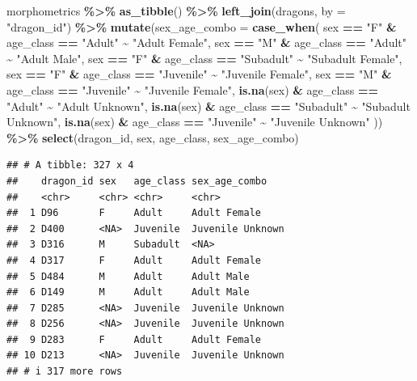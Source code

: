 \documentclass[
]{book}
\newenvironment{Shaded}{\begin{snugshade}}{\end{snugshade}}
\newcommand{\AttributeTok}[1]{\textcolor[rgb]{0.13,0.29,0.53}{#1}}
\newcommand{\FunctionTok}[1]{\textcolor[rgb]{0.13,0.29,0.53}{\textbf{#1}}}
\newcommand{\NormalTok}[1]{#1}
\newcommand{\SpecialCharTok}[1]{\textcolor[rgb]{0.81,0.36,0.00}{\textbf{#1}}}
\newcommand{\StringTok}[1]{\textcolor[rgb]{0.31,0.60,0.02}{#1}}
\begin{document}
\begin{Shaded}
\begin{Highlighting}[]
\NormalTok{morphometrics }\SpecialCharTok{\%\textgreater{}\%} 
  \FunctionTok{as\_tibble}\NormalTok{() }\SpecialCharTok{\%\textgreater{}\%} 
  \FunctionTok{left\_join}\NormalTok{(dragons, }\AttributeTok{by =} \StringTok{"dragon\_id"}\NormalTok{) }\SpecialCharTok{\%\textgreater{}\%} 
  \FunctionTok{mutate}\NormalTok{(}\AttributeTok{sex\_age\_combo =} \FunctionTok{case\_when}\NormalTok{(}
\NormalTok{    sex }\SpecialCharTok{==} \StringTok{"F"} \SpecialCharTok{\&}\NormalTok{ age\_class }\SpecialCharTok{==} \StringTok{"Adult"} \SpecialCharTok{\textasciitilde{}} \StringTok{"Adult Female"}\NormalTok{,}
\NormalTok{    sex }\SpecialCharTok{==} \StringTok{"M"} \SpecialCharTok{\&}\NormalTok{ age\_class }\SpecialCharTok{==} \StringTok{"Adult"} \SpecialCharTok{\textasciitilde{}} \StringTok{"Adult Male"}\NormalTok{,}
\NormalTok{    sex }\SpecialCharTok{==} \StringTok{"F"} \SpecialCharTok{\&}\NormalTok{ age\_class }\SpecialCharTok{==} \StringTok{"Subadult"} \SpecialCharTok{\textasciitilde{}} \StringTok{"Subadult Female"}\NormalTok{,}
\NormalTok{    sex }\SpecialCharTok{==} \StringTok{"F"} \SpecialCharTok{\&}\NormalTok{ age\_class }\SpecialCharTok{==} \StringTok{"Juvenile"} \SpecialCharTok{\textasciitilde{}} \StringTok{"Juvenile Female"}\NormalTok{,}
\NormalTok{    sex }\SpecialCharTok{==} \StringTok{"M"} \SpecialCharTok{\&}\NormalTok{ age\_class }\SpecialCharTok{==} \StringTok{"Juvenile"} \SpecialCharTok{\textasciitilde{}} \StringTok{"Juvenile Female"}\NormalTok{,}
    \FunctionTok{is.na}\NormalTok{(sex) }\SpecialCharTok{\&}\NormalTok{ age\_class }\SpecialCharTok{==} \StringTok{"Adult"} \SpecialCharTok{\textasciitilde{}} \StringTok{"Adult Unknown"}\NormalTok{,}
    \FunctionTok{is.na}\NormalTok{(sex) }\SpecialCharTok{\&}\NormalTok{ age\_class }\SpecialCharTok{==} \StringTok{"Subadult"} \SpecialCharTok{\textasciitilde{}} \StringTok{"Subadult Unknown"}\NormalTok{,}
    \FunctionTok{is.na}\NormalTok{(sex) }\SpecialCharTok{\&}\NormalTok{ age\_class }\SpecialCharTok{==} \StringTok{"Juvenile"} \SpecialCharTok{\textasciitilde{}} \StringTok{"Juvenile Unknown"}
\NormalTok{    )) }\SpecialCharTok{\%\textgreater{}\%} 
  \FunctionTok{select}\NormalTok{(dragon\_id, sex, age\_class, sex\_age\_combo)}
\end{Highlighting}
\end{Shaded}

\begin{verbatim}
## # A tibble: 327 x 4
##    dragon_id sex   age_class sex_age_combo   
##    <chr>     <chr> <chr>     <chr>           
##  1 D96       F     Adult     Adult Female    
##  2 D400      <NA>  Juvenile  Juvenile Unknown
##  3 D316      M     Subadult  <NA>            
##  4 D317      F     Adult     Adult Female    
##  5 D484      M     Adult     Adult Male      
##  6 D149      M     Adult     Adult Male      
##  7 D285      <NA>  Juvenile  Juvenile Unknown
##  8 D256      <NA>  Juvenile  Juvenile Unknown
##  9 D283      F     Adult     Adult Female    
## 10 D213      <NA>  Juvenile  Juvenile Unknown
## # i 317 more rows
\end{verbatim}
\end{document}
